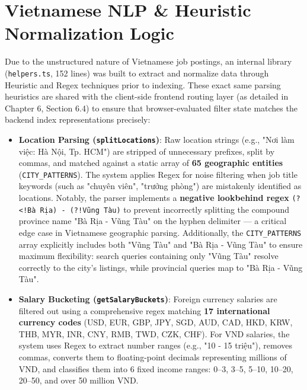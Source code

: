 \section{Vietnamese NLP \& Heuristic Normalization Logic}

Due to the unstructured nature of Vietnamese job postings, an internal library (\texttt{helpers.ts}, 152 lines) was built to extract and normalize data through Heuristic and Regex techniques prior to indexing. These exact same parsing heuristics are shared with the client-side frontend routing layer (as detailed in Chapter 6, Section 6.4) to ensure that browser-evaluated filter state matches the backend index representations precisely:

\begin{itemize}
\item \textbf{Location Parsing (\texttt{splitLocations})}: Raw location strings (e.g., "Nơi làm việc: Hà Nội, Tp. HCM") are stripped of unnecessary prefixes, split by commas, and matched against a static array of \textbf{65 geographic entities} (\texttt{CITY\_PATTERNS}). The system applies Regex for noise filtering when job title keywords (such as "chuyên viên", "trưởng phòng") are mistakenly identified as locations. Notably, the parser implements a \textbf{negative lookbehind regex} \texttt{(?<!Bà Rịa) - (?!Vũng Tàu)} to prevent incorrectly splitting the compound province name "Bà Rịa - Vũng Tàu" on the hyphen delimiter — a critical edge case in Vietnamese geographic parsing. Additionally, the \texttt{CITY\_PATTERNS} array explicitly includes both "Vũng Tàu" and "Bà Rịa - Vũng Tàu" to ensure maximum flexibility: search queries containing only "Vũng Tàu" resolve correctly to the city's listings, while provincial queries map to "Bà Rịa - Vũng Tàu".
\end{itemize}

\begin{itemize}
\item \textbf{Salary Bucketing (\texttt{getSalaryBuckets})}: Foreign currency salaries are filtered out using a comprehensive regex matching \textbf{17 international currency codes} (USD, EUR, GBP, JPY, SGD, AUD, CAD, HKD, KRW, THB, MYR, INR, CNY, RMB, TWD, CZK, CHF). For VND salaries, the system uses Regex to extract number ranges (e.g., "10 - 15 triệu"), removes commas, converts them to floating-point decimals representing millions of VND, and classifies them into 6 fixed income ranges: 0–3, 3–5, 5–10, 10–20, 20–50, and over 50 million VND.
\end{itemize}

